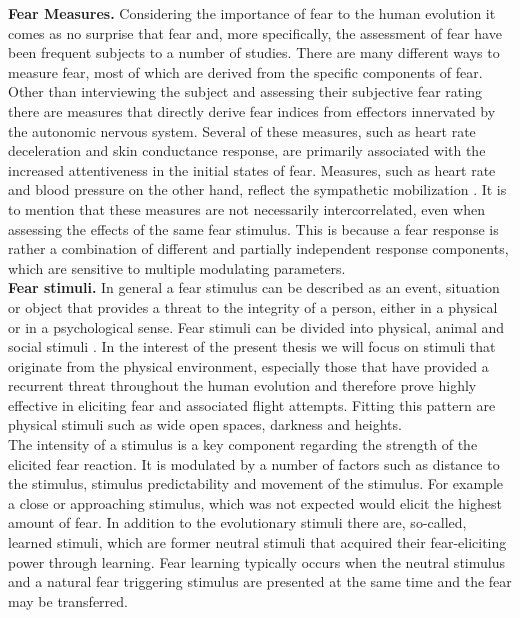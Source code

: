 \textbf{Fear Measures.} Considering the importance of fear to the human evolution it comes as no surprise that fear and, more specifically, the assessment of fear have been frequent subjects to a number of studies. There are many different ways to measure fear, most of which are derived from the specific components of fear. Other than interviewing the subject and assessing their subjective fear rating there are measures that directly derive fear indices from effectors innervated by the autonomic nervous system. Several of these measures, such as heart rate deceleration and skin conductance response, are primarily associated with the increased attentiveness in the initial states of fear. Measures, such as heart rate and blood pressure on the other hand, reflect the sympathetic mobilization \cite{FINK2010}. It is to mention that these measures are not necessarily intercorrelated, even when assessing the effects of the same fear stimulus. This is because a fear response is rather a combination of different and partially independent response components, which are sensitive to multiple modulating parameters.\\

\textbf{Fear stimuli.} In general a fear stimulus can be described as an event, situation or object that provides a threat to the integrity of a person, either in a physical or in a psychological sense. Fear stimuli can be divided into physical, animal and social stimuli \cite{FINK2010}. In the interest of the present thesis we will focus on stimuli that originate from the physical environment, especially those that have provided a recurrent threat throughout the human evolution and therefore prove highly effective in eliciting fear and associated flight attempts. Fitting this pattern are physical stimuli such as wide open spaces, darkness and heights. \\
The intensity of a stimulus is a key component regarding the strength of the elicited fear reaction. It is modulated by a number of factors such as distance to the stimulus, stimulus predictability and movement of the stimulus. For example a close or approaching stimulus, which was not expected would elicit the highest amount of fear. In addition to the evolutionary stimuli there are, so-called, learned stimuli, which are former neutral stimuli that acquired their fear-eliciting power through learning. Fear learning typically occurs when the neutral stimulus and a natural fear triggering stimulus are presented at the same time and the fear may be transferred.

